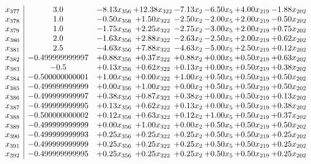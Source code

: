 \documentclass[8pt]{article}
\begin{document}
\[\begin{array}{c| c c@{\hskip 2pt} c@{\hskip 2pt} c@{\hskip 2pt} c@{\hskip 2pt} c@{\hskip 2pt} c@{\hskip 2pt} }
 x_{377}   &  3.0 & -8.13 x_{356} & + 12.38 x_{322} & -7.13 x_{2} & -6.50 x_{5} & +  4.00 x_{219} & -1.88 x_{202}\\
 x_{378}   &  1.0 & -0.50 x_{356} & +  1.50 x_{322} & -2.50 x_{2} & -2.00 x_{5} & +  2.00 x_{219} & -0.50 x_{202}\\
 x_{379}   &  1.0 & -1.75 x_{356} & +  2.25 x_{322} & -2.75 x_{2} & -3.00 x_{5} & +  2.00 x_{219} & +  0.75 x_{202}\\
 x_{380}   &  2.0 & -1.63 x_{356} & +  2.88 x_{322} & -2.63 x_{2} & -2.50 x_{5} & +  2.00 x_{219} & +  0.62 x_{202}\\
 x_{381}   &  2.5 & -4.63 x_{356} & +  7.88 x_{322} & -4.63 x_{2} & -5.00 x_{5} & +  2.50 x_{219} & +  0.12 x_{202}\\
 x_{382}   &  -0.499999999997 & +  0.88 x_{356} & +  0.37 x_{322} & +  0.88 x_{2} & +  0.00 x_{5} & +  0.50 x_{219} & +  0.63 x_{202}\\
 x_{383}   &  -0.5 & +  0.13 x_{356} & +  0.62 x_{322} & +  0.13 x_{2} & +  0.00 x_{5} & +  0.50 x_{219} & +  0.38 x_{202}\\
 x_{384}   &  -0.500000000001 & +  1.00 x_{356} & +  0.00 x_{322} & +  1.00 x_{2} & +  0.50 x_{5} & +  0.50 x_{219} & +  0.50 x_{202}\\
 x_{385}   &  -0.499999999999 & +  0.00 x_{356} & +  1.00 x_{322} & +  0.00 x_{2} & +  0.50 x_{5} & +  0.50 x_{219} & +  0.50 x_{202}\\
 x_{386}   &  -0.499999999997 & +  0.38 x_{356} & +  0.87 x_{322} & +  0.38 x_{2} & +  0.00 x_{5} & +  0.50 x_{219} & +  0.13 x_{202}\\
 x_{387}   &  -0.499999999995 & +  0.13 x_{356} & +  0.62 x_{322} & +  0.13 x_{2} & +  0.00 x_{5} & +  0.50 x_{219} & +  0.38 x_{202}\\
 x_{388}   &  -0.500000000002 & +  0.12 x_{356} & +  0.63 x_{322} & +  0.12 x_{2} & +  1.00 x_{5} & +  0.50 x_{219} & +  0.37 x_{202}\\
 x_{389}   &  -0.499999999999 & +  0.00 x_{356} & +  1.00 x_{322} & +  0.00 x_{2} & +  0.50 x_{5} & +  0.50 x_{219} & +  0.50 x_{202}\\
 x_{390}   &  -0.499999999993 & +  0.25 x_{356} & +  0.25 x_{322} & +  0.25 x_{2} & +  0.50 x_{5} & +  0.50 x_{219} & +  0.25 x_{202}\\
 x_{391}   &  -0.499999999999 & +  0.25 x_{356} & +  0.25 x_{322} & +  0.25 x_{2} & +  0.50 x_{5} & +  0.50 x_{219} & +  0.25 x_{202}\\
 x_{392}   &  -0.499999999995 & +  0.25 x_{356} & +  0.25 x_{322} & +  0.25 x_{2} & +  0.50 x_{5} & +  0.50 x_{219} & +  0.25 x_{202}\\

\end{array}\]
\end{document}
